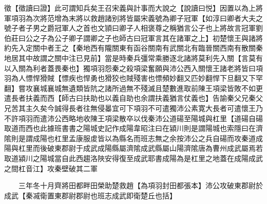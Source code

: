 徵【徵讀曰證】此可謂知兵矣王召宋義與計事而大說之【說讀曰悦】因置以為上將軍項羽為次將范增為末將以救趙諸别將皆屬宋義號為卿子冠軍【如淳曰卿者大夫之號子者子男之爵冠軍人之首也文頴曰卿子人相褒尊之稱猶言公子也上將故言冠軍劉伯莊曰公之子為公子卿子謂卿之子也師古曰冠軍言其在諸軍之上】初楚懷王與諸將約先入定關中者王之【秦地西有隴關東有函谷關南有武關北有臨晉關西南有散關秦地居其中故謂之關中注已見前】當是時秦兵彊常乘勝逐北諸將莫利先入關【言莫有以入關為利者蓋畏秦也】獨項羽怨秦之殺項梁奮願與沛公西入關懷王諸老將皆曰項羽為人慓悍猾賊【慓疾也悍勇也猾狡也賊殘害也慓頻妙翻又匹妙翻悍下旦翻又下罕翻】嘗攻襄城襄城無遺類皆阬之諸所過無不殘滅且楚數進取前陳王項梁皆敗不如更遣長者扶義而西【師古曰扶助也以義自助也余謂扶義猶言仗義也】告諭秦父兄秦父兄苦其主久矣今誠得長者往無侵㬥宜可下項羽不可遣獨沛公素寛大長者可遣懷王乃不許項羽而遣沛公西略地收陳王項梁散卒以伐秦沛公道碭至陽城與杠里【道碭自碭取道而西也此據班書書之陽城史記作成陽韋昭注曰在潁川則是謂陽城也索隱曰在濟隂則是謂成陽也杠里孟康服䖍皆以為縣名而班志無之余按沛公之兵自碭而攻秦道成陽與杠里而後破東郡尉于成武成陽縣屬濟隂成武縣屬山陽濟隂唐為曹州成武屬焉若取道潁川之陽城當自此西趨洛陜安得復至成武耶書成陽為是杠里之地蓋在成陽成武之間杠音江】攻秦壁破其二軍

　　三年冬十月齊將田都畔田榮助楚救趙【為項羽封田都張本】沛公攻破東郡尉於成武【秦㓕衛置東郡尉郡尉也班志成武即衛楚丘也括】

